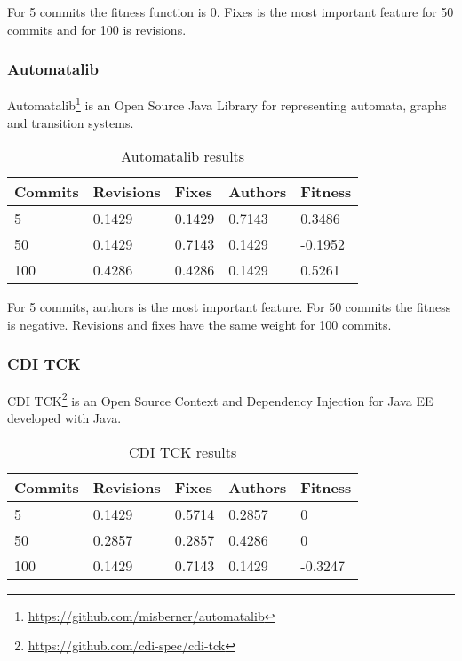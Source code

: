 For 5 commits the fitness function is 0. Fixes is the most important feature for
50 commits and for 100 is revisions.

\subsubsection{Automatalib}
Automatalib\footnote{\url{https://github.com/misberner/automatalib}} is an Open
Source Java Library for representing automata, graphs and transition systems.

\begin{table}[H]
    \centering
    \caption{Automatalib results}
    \label{table:learning_automatalib}
    \begin{tabular}{|l|l|l|l|l|}
        \hline
        Commits & Revisions & Fixes & Authors & Fitness \\ \hline
        5         & 0.1429     & 0.1429 & 0.7143   & 0.3486 \\ \hline
        50        & 0.1429 & 0.7143 & 0.1429   & -0.1952 \\ \hline
        100       & 0.4286     & 0.4286  & 0.1429   & 0.5261 \\ \hline
    \end{tabular}
\end{table}

For 5 commits, authors is the most important feature. For 50 commits the fitness
is negative. Revisions and fixes have the same weight for 100 commits.

\subsubsection{CDI TCK}
CDI TCK\footnote{\url{https://github.com/cdi-spec/cdi-tck}} is an Open Source
Context and Dependency Injection for Java EE developed with Java.

\begin{table}[H]
    \centering
    \caption{CDI TCK results}
    \label{table:learning_cditck}
    \begin{tabular}{|l|l|l|l|l|}
        \hline
        Commits & Revisions & Fixes & Authors & Fitness \\ \hline
        5         & 0.1429     & 0.5714 & 0.2857   & 0 \\ \hline
        50        & 0.2857 & 0.2857 & 0.4286   & 0 \\ \hline
        100       & 0.1429     & 0.7143  & 0.1429   & -0.3247 \\ \hline
    \end{tabular}
\end{table}

